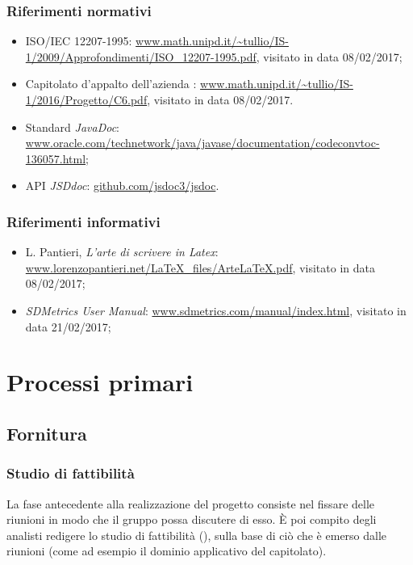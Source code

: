 \subsubsection{Riferimenti normativi}
\begin{itemize}
	\item ISO/IEC 12207-1995: \url{www.math.unipd.it/\~tullio/IS-1/2009/Approfondimenti/ISO_12207-1995.pdf}, visitato in data 08/02/2017;
	\item Capitolato d'appalto dell'azienda \ZU: \url{www.math.unipd.it/~tullio/IS-1/2016/Progetto/C6.pdf}, visitato in data 08/02/2017. %
	\item Standard \emph{JavaDoc}: \url{www.oracle.com/technetwork/java/javase/documentation/codeconvtoc-136057.html};
	\item API \emph{JSDdoc}: \url{github.com/jsdoc3/jsdoc}.
\end{itemize}

\subsubsection{Riferimenti informativi}
\begin{itemize}
	\item L. Pantieri, \emph{L'arte di scrivere in Latex}: \url{www.lorenzopantieri.net/LaTeX_files/ArteLaTeX.pdf}, visitato in data 08/02/2017;
	\item \emph{SDMetrics User Manual}: \url{www.sdmetrics.com/manual/index.html}, visitato in data 21/02/2017;
\end{itemize}





\section{Processi primari} \label{sec:primari}

\subsection{Fornitura}

	\subsubsection{Studio di fattibilità}
	La fase antecedente alla realizzazione del progetto consiste nel fissare delle riunioni in modo che il gruppo possa discutere di esso. È poi compito degli analisti redigere lo studio di fattibilità (\SdF), sulla base di ciò che è emerso dalle riunioni (come ad esempio il dominio applicativo del capitolato).


